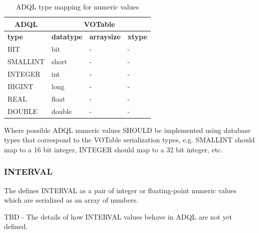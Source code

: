 \documentclass[11pt,a4paper]{ivoa}
\begin{document}
\begin{table}[th]\footnotesize
    \begin{tabular}
        {|p{}|p{}|p{}|p{}|}
        \hline

        \hline
        \multicolumn{1}{|c|}{\textbf{ADQL}} &
        \multicolumn{3}{|c|}{\textbf{VOTable}}
        \tabularnewline
        
        \hline
        \textbf{type} &
        \textbf{datatype} &
        \textbf{arraysize} &
        \textbf{xtype}
        \tabularnewline

        \hline
        BIT &
        bit &
        - &
        -
        \tabularnewline


        \hline
        SMALLINT &
        short &
        - &
        -
        \tabularnewline

        \hline
        INTEGER &
        int &
        - &
        -
        \tabularnewline

        \hline
        BIGINT &
        long &
        - &
        -
        \tabularnewline

        \hline
        REAL &
        float &
        - &
        -
        \tabularnewline

        \hline
        DOUBLE &
        double &
        - &
        -
        \tabularnewline

        \hline
    \end{tabular}
    \caption{ADQL type mapping for numeric values}
    \label{table:types.numeric.primitive}
\end{table}

Where possible ADQL numeric values SHOULD be implemented using database types
that correspond to the VOTable serialization types, e.g. SMALLINT should map to a
16 bit integer, INTEGER should map to a 32 bit integer, etc. 

\subsubsection{INTERVAL}
\label{sec:types.numeric.interval}

The \DALISpec defines INTERVAL as a pair of integer or floating-point
numeric values which are serialized as an array of numbers.

TBD - The details of how INTERVAL values behave in ADQL are not yet defined.
\end{document}
